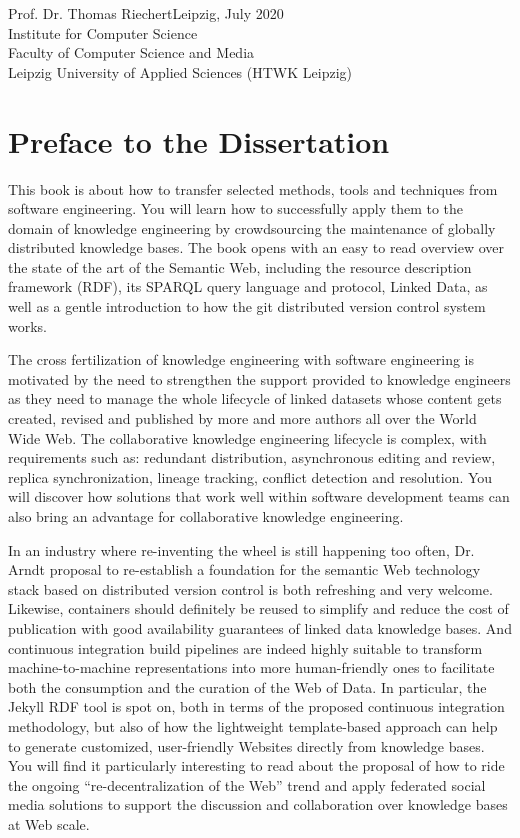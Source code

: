 \vspace{1cm}

\noindent
Prof. Dr. Thomas Riechert\hfill Leipzig, July 2020\\
Institute for Computer Science\\
Faculty of Computer Science and Media\\
Leipzig University of Applied Sciences (HTWK Leipzig)

\clearpage
\pagestyle{empty}
\null
\clearpage
\pagestyle{headings}

\section*{Preface to the Dissertation}

This book is about how to transfer selected methods, tools and techniques from software engineering. You will learn how to successfully apply them to the domain of knowledge engineering by crowdsourcing the maintenance of globally distributed knowledge bases. The book opens with an easy to read overview over the state of the art of the Semantic Web, including the resource description framework (RDF), its SPARQL query language and protocol, Linked Data, as well as a gentle introduction to how the git distributed version control system works.

The cross fertilization of knowledge engineering with software engineering is motivated by the need to strengthen the support provided to knowledge engineers as they need to manage the whole lifecycle of linked datasets whose content gets created, revised and published by more and more authors all over the World Wide Web. The collaborative knowledge engineering lifecycle is complex, with requirements such as: redundant distribution, asynchronous editing and review, replica synchronization, lineage tracking, conflict detection and resolution. You will discover how solutions that work well within software development teams can also bring an advantage for collaborative knowledge engineering.

In an industry where re-inventing the wheel is still happening too often, Dr. Arndt proposal to re-establish a foundation for the semantic Web technology stack based on distributed version control is both refreshing and very welcome. Likewise, containers should definitely be reused to simplify and reduce the cost of publication with good availability guarantees of linked data knowledge bases. And continuous integration build pipelines are indeed highly suitable to transform machine-to-machine representations into more human-friendly ones to facilitate both the consumption and the curation of the Web of Data.  In particular, the Jekyll RDF tool is spot on, both in terms of the proposed continuous integration methodology, but also of how the lightweight template-based approach can help to generate customized, user-friendly Websites directly from knowledge bases. You will find it particularly interesting to read about the proposal of how to ride the ongoing “re-decentralization of the Web” trend and apply federated social media solutions to support the discussion and collaboration over knowledge bases at Web scale.

